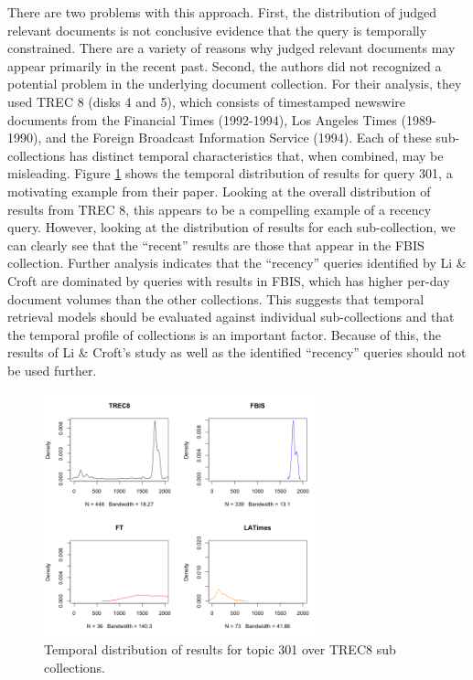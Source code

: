 \documentclass{sig-alternate}
\begin{document}
There are two problems with this approach. First, the distribution of judged relevant documents is not conclusive evidence that the query is temporally constrained. There are a variety of reasons why judged relevant documents may appear primarily in the recent past. Second, the authors did not recognized a potential problem in the underlying document collection. For their analysis, they used TREC 8 (disks 4 and 5), which consists of timestamped newswire documents from the Financial Times (1992-1994), Los Angeles Times (1989-1990), and the Foreign Broadcast Information Service (1994). Each of these sub-collections has distinct temporal characteristics that, when combined, may be misleading. Figure \ref{figure.licroft} shows the temporal distribution of results for query 301, a motivating example from their paper. Looking at the overall distribution of results from TREC 8, this appears to be a compelling example of a recency query.  However, looking at the distribution of results for each sub-collection, we can clearly see that the ``recent'' results are those that appear in the FBIS collection. Further analysis indicates that the ``recency'' queries identified by Li \& Croft are dominated by queries with results in FBIS, which has higher per-day document volumes than the other collections. This suggests that temporal retrieval models should be evaluated against individual sub-collections and that the temporal profile of collections is an important factor. Because of this, the results of Li \& Croft's study as well as the identified ``recency'' queries should not be used further.

\begin{figure}
\includegraphics[width=8cm]{images/301.png}
\caption{Temporal distribution of results for topic 301 over TREC8 sub collections.}
\label{figure.licroft}
\end{figure}
\end{document}

